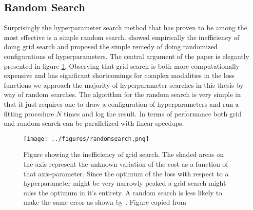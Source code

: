 \subsection{Random Search}
Surprisingly the hyperparameter search method that has proven to be among the most effective is a simple random search. \citet{Bergstra2012} showed empirically the inefficiency of doing grid search and proposed the simple remedy of doing randomized configurations of hyperparameters. The central argument of the paper is elegantly presented in figure \ref{fig:randomsearch}. Observing that grid search is both more computationally expensive and has significant shortcomings for complex modalities in the loss functions we approach the majority of hyperparameter searches in this thesis by way of random searches. The algorithm for the random search is  very simple in that it just requires one to draw a configuration of hyperparameters and run a fitting procedure $N$ times and log the result. In terms of performance both grid and random search can be parallelized with linear speedups. 

\begin{figure}[H]
\centering
\hspace*{-1.3in}\texttt{[image: ../figures/randomsearch.png]}
\caption[Why randomsearch works]{Figure showing the inefficiency of grid search. The shaded areas on the axis represent the unknown variation of the cost as a function of that axis-parameter. Since the optimum of the loss with respect to a hyperparameter might be very narrowly peaked a grid search might miss the optimum in it's entirety. A random search is less likely to make the same error as shown by \citet{Bergstra2012}. Figure copied from \citet{Bergstra2012}}\label{fig:randomsearch}
\end{figure} 
